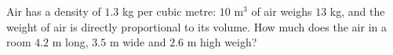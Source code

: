 Air has a density of $1.3$ kg per cubic metre: $10\text{ m}^3$ of air weighs $13$ kg, and the weight of air is directly proportional to its volume. How much does the air in a room $4.2$ m long, $3.5$ m wide and $2.6$ m high weigh?
